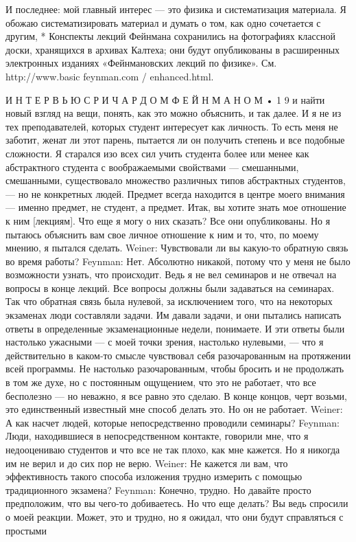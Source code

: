 \documentclass[10pt,oneside]{article}
\begin{document}
И последнее: мой главный интерес --- это физика и систематизация материала. Я обожаю систематизировать материал и думать о том, как одно сочетается с другим, * Конспекты лекций Фейнмана сохранились на фотографиях классной доски, хранящихся в архивах Калтеха; они будут опубликованы в расширенных электронных изданиях «Фейнмановских лекций по физике». См. http://www.basic feynman.com / enhanced.html.\par

И Н Т Е Р В Ь Ю  С  Р И Ч А Р Д О М  Ф Е Й Н М А Н О М • 1 9 и найти новый взгляд на вещи, понять, как это можно объяснить, и так далее. И я не из тех преподавателей, которых студент интересует как личность. То есть меня не заботит, женат ли этот парень, пытается ли он получить степень и все подобные сложности. Я старался изо всех сил учить студента более или менее как абстрактного студента с воображаемыми свойствами --- смешанными, смешанными, существовало множество различных типов абстрактных студентов, --- но не конкретных людей. Предмет всегда находится в центре моего внимания --- именно предмет, не студент, а предмет. Итак, вы хотите знать мое отношение к ним [лекциям]. Что еще я могу о них сказать? Все они опубликованы. Но я пытаюсь объяснить вам свое личное отношение к ним и то, что, по моему мнению, я пытался сделать. Weiner: Чувствовали ли вы какую-то обратную связь во время работы? Feynman: Нет. Абсолютно никакой, потому что у меня не было возможности узнать, что происходит. Ведь я не вел семинаров и не отвечал на вопросы в конце лекций. Все вопросы должны были задаваться на семинарах. Так что обратная связь была нулевой, за исключением того, что на некоторых экзаменах люди составляли задачи. Им давали задачи, и они пытались написать ответы в определенные экзаменационные недели, понимаете. И эти ответы были настолько ужасными --- с моей точки зрения, настолько нулевыми, --- что я действительно в каком-то смысле чувствовал себя разочарованным на протяжении всей программы. Не настолько разочарованным, чтобы бросить и не продолжать в том же духе, но с постоянным ощущением, что это не работает, что все бесполезно --- но неважно, я все равно это сделаю. В конце концов, черт возьми, это единственный известный мне способ делать это. Но он не работает. Weiner: А как насчет людей, которые непосредственно проводили семинары? Feynman: Люди, находившиеся в непосредственном контакте, говорили мне, что я недооцениваю студентов и что все не так плохо, как мне кажется. Но я никогда им не верил и до сих пор не верю. Weiner: Не кажется ли вам, что эффективность такого способа изложения трудно измерить с помощью традиционного экзамена? Feynman: Конечно, трудно. Но давайте просто предположим, что вы чего-то добиваетесь. Но что еще делать? Вы ведь спросили о моей реакции. Может, это и трудно, но я ожидал, что они будут справляться с простыми\par
\end{document}
